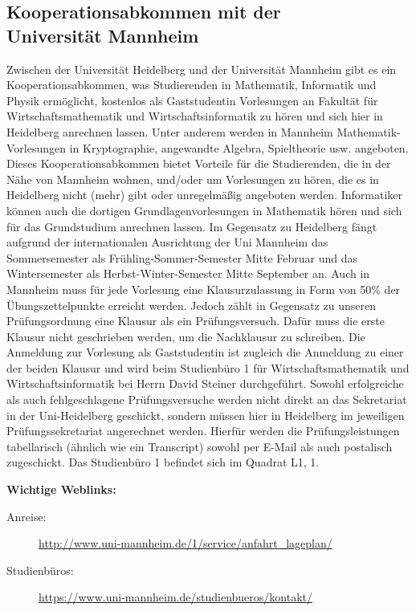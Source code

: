\subsection{Kooperationsabkommen mit der \\Universität Mannheim}
Zwischen der Universität Heidelberg und der Universität Mannheim gibt es ein Kooperationsabkommen, was Studierenden in Mathematik, Informatik und Physik ermöglicht, kostenlos als Gaststudentin Vorlesungen an Fakultät für Wirtschaftsmathematik und Wirtschaftsinformatik zu hören und sich hier in Heidelberg anrechnen lassen. Unter anderem werden in Mannheim Mathematik-Vorlesungen in Kryptographie, angewandte Algebra, Spieltheorie usw. angeboten. Dieses Kooperationsabkommen bietet Vorteile für die Studierenden, die in der Nähe von Mannheim wohnen, und/oder um Vorlesungen zu hören, die es in Heidelberg nicht (mehr) gibt oder unregelmäßig angeboten werden. Informatiker können auch die dortigen Grundlagenvorlesungen in Mathematik hören und sich für das Grundstudium anrechnen lassen. Im Gegensatz zu Heidelberg fängt aufgrund der internationalen Ausrichtung der Uni Mannheim das Sommersemester als Frühling-Sommer-Semester Mitte Februar und das Wintersemester als Herbst-Winter-Semester Mitte September an. Auch in Mannheim muss für jede Vorlesung eine Klausurzulassung in Form von 50\% der Übungszettelpunkte erreicht werden. Jedoch zählt in Gegensatz zu unseren Prüfungsordnung eine Klausur als ein Prüfungsversuch. Dafür muss die erste Klausur nicht geschrieben werden, um die Nachklausur zu schreiben. Die Anmeldung zur Vorlesung als Gaststudentin ist zugleich die Anmeldung zu einer der beiden Klausur und wird beim Studienbüro 1 für Wirtschaftsmathematik und Wirtschaftsinformatik bei Herrn David Steiner durchgeführt. Sowohl erfolgreiche als auch fehlgeschlagene Prüfungsversuche werden nicht direkt an das Sekretariat in der Uni-Heidelberg geschickt, sondern müssen hier in Heidelberg im jeweiligen Prüfungssekretariat angerechnet werden. Hierfür werden die Prüfungsleistungen tabellarisch (ähnlich wie ein Transcript) sowohl per E-Mail als auch postalisch zugeschickt. Das Studienbüro 1 befindet sich im Quadrat L1, 1. 

\noindent \textbf{Wichtige Weblinks:} 
\begin{description}
\item[Anreise:] \url{http://www.uni-mannheim.de/1/service/anfahrt_lageplan/}
\item[Studienbüros:] \url{https://www.uni-mannheim.de/studienbueros/kontakt/}
\end{description}
